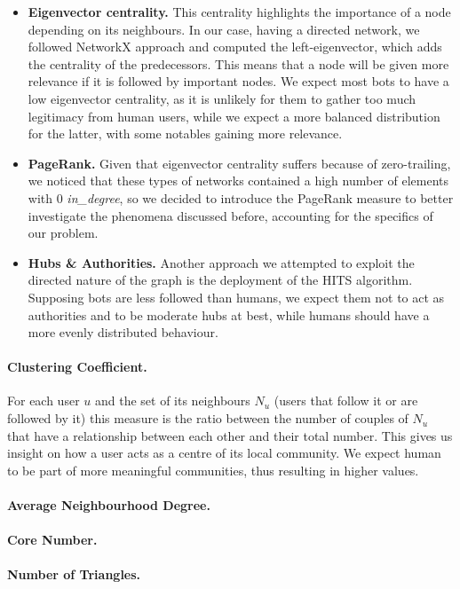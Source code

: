 \documentclass[12pt, a4paper]{article}
\begin{document}
\begin{itemize}
			\item \textbf{Eigenvector centrality.} This centrality highlights the importance of a node depending on its neighbours. In our case, having a directed network, we followed NetworkX approach and computed the left-eigenvector, which adds the centrality of the predecessors. This means that a node will be given more relevance if it is followed by important nodes. We expect most bots to have a low eigenvector centrality, as it is unlikely for them to gather too much legitimacy from human users, while we expect a more balanced distribution for the latter, with some notables gaining more relevance.
			\item \textbf{PageRank.} Given that eigenvector centrality suffers because of zero-trailing, we noticed that these types of networks contained a high number of elements with 0 \textit{in\_degree}, so we decided to introduce the PageRank measure to better investigate the phenomena discussed before, accounting for the specifics of our problem. 
			\item \textbf{Hubs \& Authorities.} Another approach we attempted to exploit the directed nature of the graph is the deployment of the HITS algorithm. Supposing bots are less followed than humans, we expect them not to act as authorities and to be moderate hubs at best, while humans should have a more evenly distributed behaviour.
		\end{itemize}
		\paragraph{Clustering Coefficient.}
		For each user \(u\) and the set of its neighbours \(N_{u}\) (users that follow it or are followed by it) this measure is the ratio between the number of couples of \(N_{u}\) that have a relationship between each other and their total number. This gives us insight on how a user acts as a centre of its local community. We expect human to be part of more meaningful communities, thus resulting in higher values.
		\paragraph{Average Neighbourhood Degree.}
		\paragraph{Core Number.}
		\paragraph{Number of Triangles.}
\end{document}
